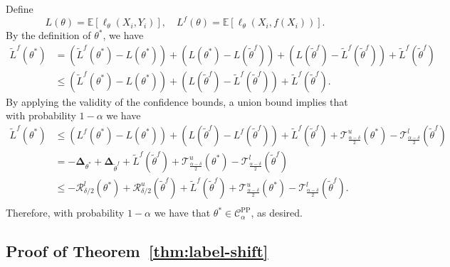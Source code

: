 \documentclass[10pt]{article}
\def\E{\mathbb{E}}
\newcommand{\T}{\mathcal{T}}
\newcommand{\cR}{\mathcal{R}}
\newcommand{\thetaf}{\tilde{\theta}^{f}}
\newcommand{\rec}{\mathbf{\Delta}}
\newcommand{\CPP}{\mathcal{C}^{\mathrm{PP}}}
\begin{document}
Define
$$L(\theta) = \E [\ell_\theta(X_i,Y_i)], \quad L^f(\theta) = \E [\ell_\theta(X_i,f(X_i))].$$
By the definition of $\theta^*$, we have
\begin{align*}
\tilde L^f(\theta^*) &= (\tilde L^f(\theta^*) -  L(\theta^*)) + ( L(\theta^* ) - L(\thetaf) ) +  (  L(\thetaf) - \tilde L^f(\thetaf))  + \tilde L^f(\thetaf) \\
&\leq (\tilde L^f(\theta^*) -  L(\theta^* )) +  (  L(\thetaf) - \tilde L^f(\thetaf))  + \tilde L^f(\thetaf).
\end{align*}
By applying the validity of the confidence bounds, a union bound implies that with probability $1-\alpha$ we have
\begin{align*}
\tilde L^f(\theta^*) &\leq ( L^f(\theta^*) -  L(\theta^* )) +  (  L(\thetaf) -  L^f(\thetaf))  + \tilde L^f(\thetaf) + \T_{\frac{\alpha-\delta}{2}}^u(\theta^*) - \T_{\frac{\alpha-\delta}{2}}^l(\thetaf) \\
&= - \rec_{\theta^*} + \rec_{\thetaf} + \tilde L^f(\thetaf) + \T_{\frac{\alpha-\delta}{2}}^u(\theta^*) - \T_{\frac{\alpha-\delta}{2}}^l(\thetaf)   \\
&\leq -\cR_{\delta/2}^l(\theta^*) + \cR_{\delta/2}^u(\thetaf) + \tilde L^f(\thetaf) + \T_{\frac{\alpha-\delta}{2}}^u(\theta^*) - \T_{\frac{\alpha-\delta}{2}}^l(\thetaf). \\
\end{align*}
Therefore, with probability $1-\alpha$ we have that $\theta^* \in \CPP_\alpha$, as desired.


\subsection{Proof of Theorem~\ref{thm:label-shift}}
\label{app:label-shift}
\end{document}
